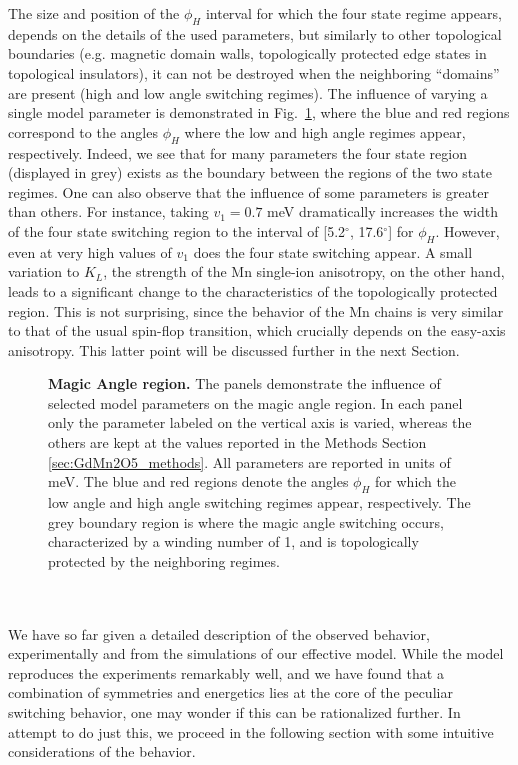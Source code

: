 The size and position of the $\phi_H$ interval for which the four state regime appears, depends on the details of the used parameters, but similarly to other topological boundaries (e.g. magnetic domain walls, topologically protected edge states in topological insulators), it can not be destroyed when the neighboring ``domains'' are present (high and low angle switching regimes).
The influence of varying a single model parameter is demonstrated in Fig.~\ref{fig:GdMn2O5_windingvsparam}, where the blue and red regions correspond to the angles $\phi_H$ where the low and high angle regimes appear, respectively.
Indeed, we see that for many parameters the four state region (displayed in grey) exists as the boundary between the regions of the two state regimes.
One can also observe that the influence of some parameters is greater than others. For instance, taking $v_1=0.7$ meV dramatically increases the width of the four state switching region to the interval of [5.2$^\circ$, 17.6$^\circ$] for $\phi_H$.
However, even at very high values of $v_1$ does the four state switching appear.
A small variation to $K_L$, the strength of the Mn single-ion anisotropy, on the other hand, leads to a significant change to the characteristics of the topologically protected region.
This is not surprising, since the behavior of the Mn chains is very similar to that of the usual spin-flop transition, which crucially depends on the easy-axis anisotropy. This latter point will be discussed further in the next Section.
\begin{figure}
	\caption{\label{fig:GdMn2O5_windingvsparam} {\bf Magic Angle region.} The panels demonstrate the influence of selected model parameters on the magic angle region. In each panel only the parameter labeled on the vertical axis is varied, whereas the others are kept at the values reported in the Methods Section \ref{sec:GdMn2O5_methods}. All parameters are reported in units of meV. The blue and red regions denote the angles $\phi_H$ for which the low angle and high angle switching regimes appear, respectively. The grey boundary region is where the magic angle switching occurs, characterized by a winding number of 1, and is topologically protected by the neighboring regimes.}
\end{figure}
\\\\
We have so far given a detailed description of the observed behavior, experimentally and from the simulations of our effective model.
While the model reproduces the experiments remarkably well, and we have found that a combination of symmetries and energetics lies at the core of the peculiar switching behavior, one may wonder if this can be rationalized further.
In attempt to do just this, we proceed in the following section with some intuitive considerations of the behavior.

